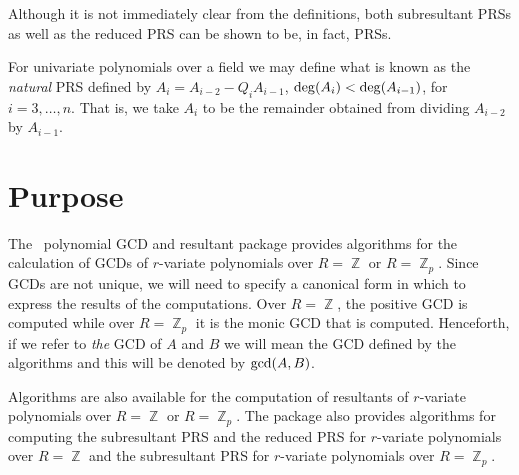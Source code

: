 Although it is not immediately clear from the definitions, both
subresultant PRSs as well as the reduced PRS can be shown to be, in
fact, PRSs.

For univariate polynomials over a field we may define what is known as
the {\em natural} PRS defined by $A_i = A_{i-2} - Q_iA_{i-1}$, ${\rm
deg}(A_i) < {\rm deg}(A_{i-1})$, for $i = 3,\ldots,n$.  That is, we
take $A_i$ to be the remainder obtained from dividing $A_{i-2}$
by $A_{i-1}$.

\section{Purpose}
The \saclib\ polynomial GCD and resultant package provides algorithms
for the calculation of GCDs of $r$-variate polynomials over $R =
\BbbZ$ or $R = \BbbZ_p$.  Since GCDs are not unique, we will need to
specify a canonical form in which to express the results of the
computations. Over $R = \BbbZ$, the positive GCD is computed while
over $R = \BbbZ_p$ it is the monic GCD that is computed. Henceforth,
if we refer to {\em the} GCD of $A$ and $B$ we will mean the GCD
defined by the algorithms and this will be denoted by ${\rm
gcd}(A,B)$.

Algorithms are also available for the computation of resultants of
$r$-variate polynomials over $R = \BbbZ$ or $R = \BbbZ_p$. The package
also provides algorithms for computing the subresultant PRS and the
reduced PRS for $r$-variate polynomials over $R = \BbbZ$ and the
subresultant PRS for $r$-variate polynomials over $R = \BbbZ_p$.

